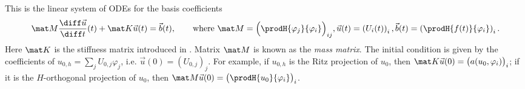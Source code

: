 This is the linear system of ODEs for the basis coefficients
\begin{equation}
    \label{eq:Galerkin parabolic linear algebra}
    \mat M \frac{\diff \vec u}{\diff t} (t) + \mat K \vec u (t) = \vec b (t), \qquad
    \text{where } \mat M = \Big( \prodH{\varphi_j}{\varphi_i} \Big)_{ij},
    \vec u (t) = \left(U_i(t)\right)_i,
    \vec b (t) = \left(\prodH{f(t)}{\varphi_i}\right)_i.
\end{equation}
Here $\mat K$ is the stiffness matrix introduced in .
Matrix $\mat M$ is known as the \emph{mass matrix}.
The initial condition is given by the coefficients of $u_{0,h} = \sum_{j} U_{0,j} \varphi_j$, i.e. $\vec u(0) = (U_{0,j})_j$. For example, if $u_{0,h}$ is the Ritz projection of $u_0$, then $\mat K \vec u(0) = \big(a(u_0, \varphi_i)\big)_i$; if it is the $H$-orthogonal projection of $u_0$, then $\mat M \vec u(0) = \big(\prodH{u_0}{\varphi_i}\big)_i$.

